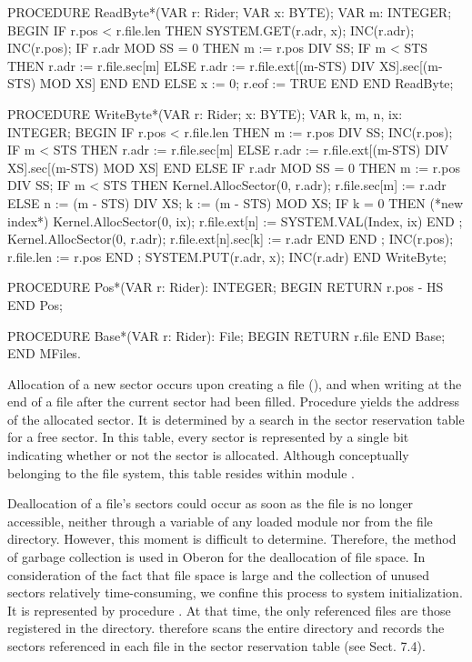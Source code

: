   PROCEDURE ReadByte*(VAR r: Rider; VAR x: BYTE);
  VAR m: INTEGER;
  BEGIN
    IF r.pos < r.file.len THEN
      SYSTEM.GET(r.adr, x); INC(r.adr); INC(r.pos);
      IF r.adr MOD SS = 0 THEN
        m := r.pos DIV SS;
        IF m < STS THEN r.adr := r.file.sec[m]
        ELSE r.adr := r.file.ext[(m-STS) DIV XS].sec[(m-STS) MOD XS]
        END
      END
    ELSE x := 0; r.eof := TRUE
    END
  END ReadByte;

  PROCEDURE WriteByte*(VAR r: Rider; x: BYTE);
  VAR k, m, n, ix: INTEGER;
  BEGIN
    IF r.pos < r.file.len THEN
      m := r.pos DIV SS; INC(r.pos);
      IF m < STS THEN r.adr := r.file.sec[m]
      ELSE r.adr := r.file.ext[(m-STS) DIV XS].sec[(m-STS) MOD XS]
      END
    ELSE
      IF r.adr MOD SS = 0 THEN
        m := r.pos DIV SS;
        IF m < STS THEN Kernel.AllocSector(0, r.adr); r.file.sec[m] := r.adr
        ELSE
          n := (m - STS) DIV XS; k := (m - STS) MOD XS;
          IF k = 0 THEN (*new index*)
            Kernel.AllocSector(0, ix); r.file.ext[n] := SYSTEM.VAL(Index, ix)
          END ;
          Kernel.AllocSector(0, r.adr); r.file.ext[n].sec[k] := r.adr
        END
      END ;
      INC(r.pos); r.file.len := r.pos
    END ;
    SYSTEM.PUT(r.adr, x); INC(r.adr)
  END WriteByte;

  PROCEDURE Pos*(VAR r: Rider): INTEGER;
  BEGIN
    RETURN r.pos - HS
  END Pos;

  PROCEDURE Base*(VAR r: Rider): File;
  BEGIN
    RETURN r.file
  END Base;
END MFiles.
\endtt

\noindent Allocation of a new sector occurs upon creating a file (), and when writing at the end of a file after the current sector had been filled. Procedure  yields the address of the allocated sector. It is determined by a search in the sector reservation table for a free sector. In this table, every sector is represented by a single bit indicating whether or not the sector is allocated. Although conceptually belonging to the file system, this table resides within module .

Deallocation of a file's sectors could occur as soon as the file is no longer accessible, neither through a variable of any loaded module nor from the file directory. However, this moment is difficult to determine. Therefore, the method of garbage collection is used in Oberon for the deallocation of file space. In consideration of the fact that file space is large and the collection of unused sectors relatively time-consuming, we confine this process to system initialization. It is represented by procedure . At that time, the only referenced files are those registered in the directory.  therefore scans the entire directory and records the sectors referenced in each file in the sector reservation table (see Sect. 7.4).

